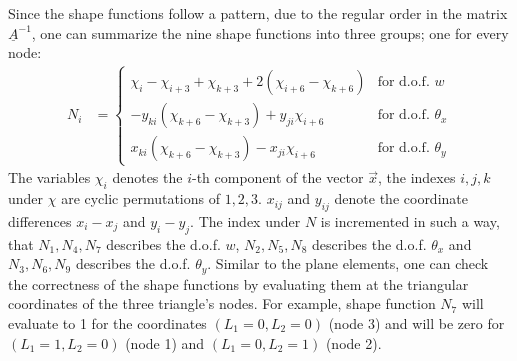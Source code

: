  Since the shape functions follow a pattern, due to the regular order in the matrix $\underline{A}^{-1}$, one can summarize the nine shape functions into three groups; one for every node:
  \begin{align}
  N_i &= \begin{cases}
  \chi_i - \chi_{i+3} + \chi_{k+3} + 2\left(\chi_{i+6} - \chi_{k+6}\right) & \text{for d.o.f. } w\\
  -y_{ki}\left(\chi_{k+6} - \chi_{k+3}\right) + y_{ji} \chi_{i+6} & \text{for d.o.f. } \theta_x\\
  x_{ki}\left(\chi_{k+6} - \chi_{k+3}\right) - x_{ji} \chi_{i+6} & \text{for d.o.f. } \theta_y
  \end{cases}
  \end{align}
  The variables $\chi_i$ denotes the $i$-th component of the vector $\vec{x}$, the indexes $i,j,k$ under $\chi$ are cyclic permutations of $1,2,3$. $x_{ij}$ and $y_{ij}$ denote the coordinate differences $x_i - x_j$ and $y_i - y_j$. The index under $N$ is incremented in such a way, that $N_1, N_4, N_7$ describes the d.o.f. $w$, $N_2, N_5, N_8$ describes the d.o.f. $\theta_x$ and $N_3, N_6, N_9$ describes the d.o.f. $\theta_y$.
  Similar to the plane elements, one can check the correctness of the shape functions by evaluating them at the triangular coordinates of the three triangle's nodes. For example, shape function $N_7$ will evaluate to 1 for the coordinates $(L_1 = 0, L_2 = 0)$ (node 3) and will be zero for $(L_1 = 1, L_2 = 0)$ (node 1) and $(L_1 = 0, L_2 = 1)$ (node 2).
  
